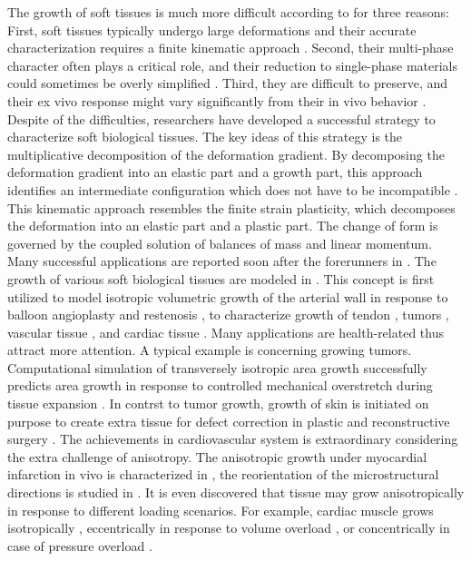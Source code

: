 The growth of soft tissues is much more difficult according to \cite{Menzel} for three reasons: First, soft tissues typically undergo large deformations and their accurate characterization requires a finite kinematic approach \cite{Rodriguez}. Second, their multi-phase character often plays a critical role, and their reduction to single-phase materials could sometimes be overly simplified \cite{Mow}. Third, they are difficult to preserve, and their ex vivo response might vary significantly from their in vivo behavior \cite{Krishnamurthy}. Despite of the difficulties, researchers have developed a successful strategy to characterize soft biological tissues. The key ideas of this strategy is the multiplicative decomposition of the deformation gradient. By decomposing the deformation gradient into an elastic part and a growth part, this approach identifies an intermediate configuration which does not have to be incompatible \cite{Goriely, Menzel2, Rodriguez}. This kinematic approach resembles the finite strain plasticity, which decomposes the deformation into an elastic part and a plastic part. The change of form is governed by the coupled solution of balances of mass and linear momentum. Many successful applications are reported soon after the forerunners in \cite{Hsu, Skalak}. The growth of various soft biological tissues are modeled in \cite{Garikipati, Lubarda}. This concept is first utilized to model isotropic volumetric growth of the arterial wall in response to balloon angioplasty and restenosis \cite{Himpel, Kuhl3}, to characterize growth of tendon \cite{Garikipati2}, tumors \cite{Ambrosi2}, vascular tissue \cite{Humphrey2, Humphrey3, Taber}, and cardiac tissue \cite{Kroon, Goktepe}. Many applications are health-related thus attract more attention. A typical example is concerning growing tumors. Computational simulation of transversely isotropic area growth successfully predicts area growth in response to controlled mechanical overstretch during tissue expansion \cite{Zollner}. In contrst to tumor growth, growth of skin is initiated on purpose to create extra tissue for defect correction in plastic and reconstructive surgery \cite{Zollner2}. The achievements in cardiovascular system is extraordinary considering the extra challenge of anisotropy. The anisotropic growth under myocardial infarction in vivo is characterized in \cite{Tsamis}, the reorientation of the microstructural directions is studied in \cite{Kuhl4, Kuhl5}. It is even discovered that tissue may grow anisotropically in response to different loading scenarios. For example, cardiac muscle grows isotropically \cite{Kroon}, eccentrically in response to volume overload \cite{Goktepe2}, or concentrically in case of pressure overload \cite{Rausch}.

